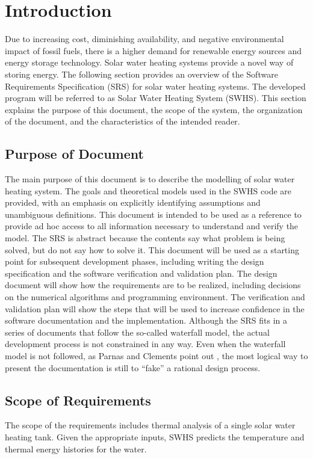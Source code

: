 \documentclass[12pt]{article}
\begin{document}
\section{Introduction}
\label{Sec:Intro}
Due to increasing cost, diminishing availability, and negative environmental impact of fossil fuels, there is a higher demand for renewable energy sources and energy storage technology. Solar water heating systems provide a novel way of storing energy.
The following section provides an overview of the Software Requirements Specification (SRS) for solar water heating systems. The developed program will be referred to as Solar Water Heating System (SWHS). This section explains the purpose of this document, the scope of the system, the organization of the document, and the characteristics of the intended reader.
\subsection{Purpose of Document}
\label{Sec:DocPurpose}
The main purpose of this document is to describe the modelling of solar water heating system. The goals and theoretical models used in the SWHS code are provided, with an emphasis on explicitly identifying assumptions and unambiguous definitions. This document is intended to be used as a reference to provide ad hoc access to all information necessary to understand and verify the model. The SRS is abstract because the contents say what problem is being solved, but do not say how to solve it.
This document will be used as a starting point for subsequent development phases, including writing the design specification and the software verification and validation plan. The design document will show how the requirements are to be realized, including decisions on the numerical algorithms and programming environment. The verification and validation plan will show the steps that will be used to increase confidence in the software documentation and the implementation. Although the SRS fits in a series of documents that follow the so-called waterfall model, the actual development process is not constrained in any way. Even when the waterfall model is not followed, as Parnas and Clements point out \cite{parnasClements1986}, the most logical way to present the documentation is still to ``fake'' a rational design process.
\subsection{Scope of Requirements}
\label{Sec:ReqsScope}
The scope of the requirements includes thermal analysis of a single solar water heating tank. Given the appropriate inputs, SWHS predicts the temperature and thermal energy histories for the water.
\end{document}
